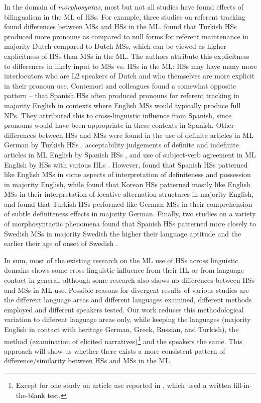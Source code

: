 \documentclass[output=paper,colorlinks,citecolor=brown]{langscibook}
\begin{document}
In the domain of \textit{morphosyntax}, most but not all studies have found effects of bilingualism in the ML of HSs. For example, three studies on referent tracking found differences between MSs and HSs in the ML. \citet{azar2020reference} found that Turkish HSs produced more pronouns as compared to null forms for referent maintenance in majority Dutch compared to Dutch MSs, which can be viewed as higher explicitness of HSs than MSs in the ML. The authors attribute this explicitness to differences in likely input to MSs vs. HSs in the ML: HSs may have many more interlocutors who are L2 speakers of Dutch and who themselves are more explicit in their pronoun use. Contemori and colleagues \parencite{Contemori2021a, Contemori2023} found a somewhat opposite pattern -- that Spanish HSs often produced pronouns for referent tracking in majority English in contexts where English MSs would typically produce full NPs. They attributed this to cross-linguistic influence from Spanish, since pronouns would have been appropriate in these contexts in Spanish. Other differences between HSs and MSs were found in the use of definite articles in ML German by Turkish HSs \parencite{Felser2019}, acceptability judgements of definite and indefinite articles in ML English by Spanish HSs \parencite{MontrulIonin2010}, and use of subject-verb agreement in ML English by HSs with various HLs \parencite{Paradis2019}. However, \citet{MontrulIonin2010} found that Spanish HSs patterned like English MSs in some aspects of interpretation of definiteness and possession in majority English, while \citet{Lee-Ellis2012} found that Korean HSs patterned mostly like English MSs in their interpretation of locative alternation structures in majority English, and \citet{Kupisch2017} found that Turkish HSs performed like German MSs in their comprehension of subtle definiteness effects in majority German. Finally, two studies on a variety of morphosyntactic phenomena found that Spanish HSs patterned more closely to Swedish MSs in majority Swedish the higher their language aptitude \parencite{Bylund2012} and the earlier their age of onset of Swedish \parencite{Bylund2021}.

In sum, most of the existing research on the ML use of HSs across linguistic domains shows some cross-linguistic influence from their HL or from language contact in general, although some research also shows no differences between HSs and MSs in ML use. Possible reasons for divergent results of various studies are the different language areas and different languages examined, different methods employed and different speakers tested. Our work reduces this methodological variation to different language areas only, while keeping the languages (majority English in contact with heritage German, Greek, Russian, and Turkish), the method (examination of elicited narratives)\footnote{ {Except for one study on article use reported in , which used a written fill-in-the-blank test.}} and the speakers the same. This approach will show us whether there exists a more consistent pattern of difference/similarity between HSs and MSs in the ML.
\end{document}
